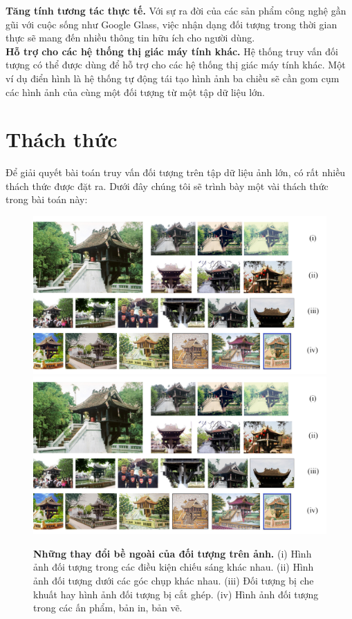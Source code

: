 \textbf{Tăng tính tương tác thực tế.} Với sự ra đời của các sản phẩm công nghệ gần gũi với cuộc sống như Google Glass, việc nhận dạng đối tượng trong thời gian thực sẽ mang đến nhiều thông tin hữu ích cho người dùng.\\
\textbf{Hỗ trợ cho các hệ thống thị giác máy tính khác.} Hệ thống truy vấn đối tượng có thể được dùng để hỗ trợ cho các hệ thống thị giác máy tính khác. Một ví dụ điển hình là hệ thống tự động tái tạo hình ảnh ba chiều sẽ cần gom cụm các hình ảnh của cùng một đối tượng từ một tập dữ liệu lớn.\\

\section{Thách thức}
 Để giải quyết bài toán truy vấn đối tượng trên tập dữ liệu ảnh lớn, có rất nhiều thách thức được đặt ra. Dưới đây chúng tôi sẽ trình bày một vài thách thức trong bài toán này:\\
 \begin{figure}[!htbp]
  \begin{center}
    \leavevmode
    \ifpdf
      \includegraphics[scale=0.20]{chuaMotCot}
    \else
      \includegraphics[scale=0.20]{chuaMotCot}
    \fi
    \caption[Những thay đổi bề ngoài của đối tượng trên ảnh]{\textbf{Những thay đổi bề ngoài của đối tượng trên ảnh.} (i) Hình ảnh đối tượng trong các điều kiện chiếu sáng khác nhau. (ii) Hình ảnh đối tượng dưới các góc chụp khác nhau. (iii) Đối tượng bị che khuất hay hình ảnh đối tượng bị cắt ghép. (iv) Hình ảnh đối tượng trong các ấn phẩm, bản in, bản vẽ.}
    \label{FigTemple}
  \end{center}
\end{figure} 
